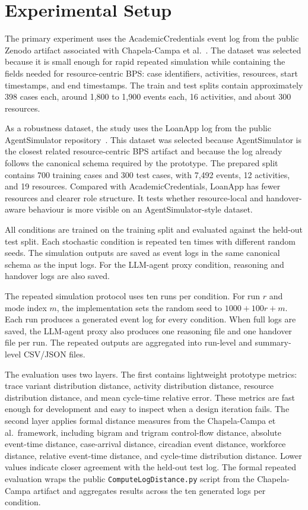 \section{Experimental Setup}\label{experimental-setup}

The primary experiment uses the AcademicCredentials event log from the
public Zenodo artifact associated with Chapela-Campa et al.~\cite{chapela2025quality}. The
dataset was selected because it is small enough for rapid repeated
simulation while containing the fields needed for resource-centric BPS:
case identifiers, activities, resources, start timestamps, and end
timestamps. The train and test splits contain approximately 398 cases
each, around 1,800 to 1,900 events each, 16 activities, and about 300
resources.

As a robustness dataset, the study uses the LoanApp log from the public
AgentSimulator repository~\cite{kirchdorfer2024agentsimulator}. This
dataset was selected because AgentSimulator is the closest related
resource-centric BPS artifact and because the log already follows the
canonical schema required by the prototype. The prepared split contains
700 training cases and 300 test cases, with 7,492 events, 12
activities, and 19 resources. Compared with AcademicCredentials,
LoanApp has fewer resources and clearer role structure. It tests whether
resource-local and handover-aware behaviour is more visible on an
AgentSimulator-style dataset.

All conditions are trained on the training split and evaluated against
the held-out test split. Each stochastic condition is repeated ten times
with different random seeds. The simulation outputs are saved as event
logs in the same canonical schema as the input logs. For the LLM-agent
proxy condition, reasoning and handover logs are also saved.

The repeated simulation protocol uses ten runs per condition. For run
\(r\) and mode index \(m\), the implementation sets the random seed to
\(1000 + 100r + m\). Each run produces a generated event log for every
condition. When full logs are saved, the LLM-agent proxy also produces
one reasoning file and one handover file per run. The repeated outputs
are aggregated into run-level and summary-level CSV/JSON files.

The evaluation uses two layers. The first contains lightweight prototype
metrics: trace variant distribution distance, activity distribution
distance, resource distribution distance, and mean cycle-time relative
error. These metrics are fast enough for development and easy to inspect
when a design iteration fails. The second layer applies formal distance
measures from the Chapela-Campa et al.~framework, including
bigram and trigram control-flow distance, absolute event-time distance,
case-arrival distance, circadian event distance, workforce distance,
relative event-time distance, and cycle-time distribution distance.
Lower values indicate closer agreement with the held-out test log. The
formal repeated evaluation wraps the public
\texttt{ComputeLogDistance.py} script from the Chapela-Campa artifact
and aggregates results across the ten generated logs per condition.

